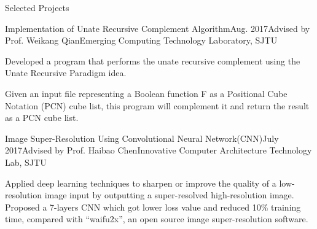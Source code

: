 \documentclass{resume_Stanford} %
\begin{document}
\begin{rSection}{Selected Projects}
\begin{rSubsection}{Implementation of Unate Recursive Complement Algorithm}{Aug. 2017}{Advised by Prof. Weikang Qian}{Emerging Computing Technology Laboratory, SJTU}
\item Developed a program that performs the unate recursive complement using the Unate Recursive Paradigm idea.
\item Given an input file representing a Boolean function F as a Positional Cube Notation (PCN) cube list, this program will complement it and return the result as a PCN cube list.
\end{rSubsection}

\begin{comment}
\begin{rSubsection}{Reading Combinational Circuit and Evaluating Its Outputs}{July 2017}{Advised by Prof. Weikang Qian}{Emerging Computing Technology Laboratory, SJTU}
\item Designed a software tool which can read "bench" format file describing a combinational circuit and implemented a topological sorting algorithm to calculate the values for all the primary outputs of the circuits.
\end{rSubsection}
\end{comment}

\begin{rSubsection}{Image Super-Resolution Using Convolutional Neural Network(CNN)}{July 2017}{Advised by Prof. Haibao Chen}{Innovative Computer Architecture Technology Lab, SJTU}
\item Applied deep learning techniques to sharpen or improve the quality of a low-resolution image input by outputting a super-resolved high-resolution image. Proposed a 7-layers CNN which got lower loss value and reduced 10\% training time, compared with ``waifu2x'', an open source image super-resolution software.
\end{rSubsection}

\begin{comment}
\begin{rSubsection}{``Eye of Providence'', an Intelligent Monitoring System}{May 2017}{}{}
\item Led a group of 4 teammates to build an intelligent classroom monitoring system using face recognition, facial expression detection and speech identification techniques during ``Hackathon SJTU 2017''.
\end{rSubsection}
\end{comment}


\end{rSection}
\end{document}
